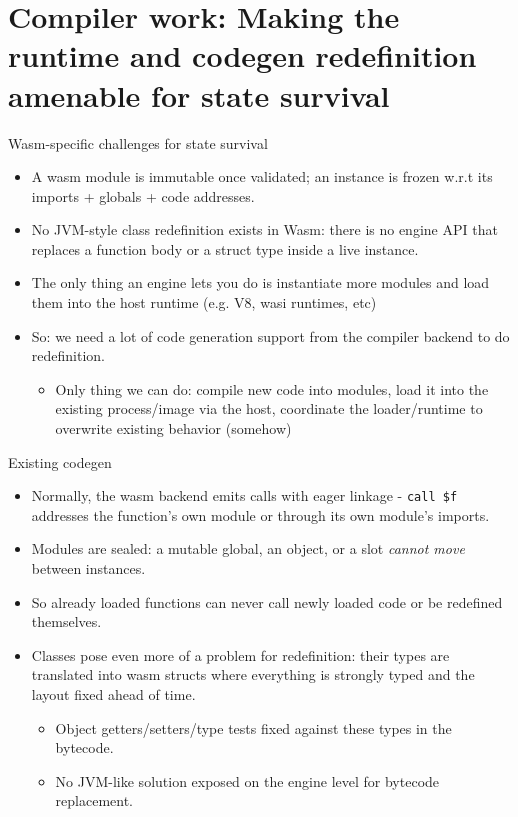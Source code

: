 \documentclass[10pt,presentation]{beamer}
\begin{document}
\section*{Compiler work: Making the runtime and codegen redefinition amenable for state survival}
\label{sec:org647bbfc}

\begin{frame}[label={sec:orgbf0cb6b}]{Wasm-specific challenges for state survival}
\begin{itemize}
\item A wasm module is immutable once validated; an instance is frozen
w.r.t its imports + globals + code addresses.
\item No JVM-style class redefinition exists in Wasm: there is no engine
API that replaces a function body or a struct type inside a live
instance.
\item The \alert{only} thing an engine lets you do is instantiate \alert{more} modules
and load them into the host runtime (e.g. V8, wasi runtimes, etc)
\item So: we need a lot of code generation support from the compiler
backend to do redefinition.
\begin{itemize}
\item Only thing we can do: compile new code into modules, load it into
the existing process/image via the host, coordinate the
loader/runtime to overwrite existing behavior (somehow)
\end{itemize}
\end{itemize}
\end{frame}
\begin{frame}[label={sec:orgbed6dab},fragile]{Existing codegen}
 \begin{itemize}
\item Normally, the wasm backend emits calls with eager linkage - \texttt{call
  \$f} addresses the function's own module or through its own module's
imports.
\item Modules are sealed: a mutable global, an object, or a slot \emph{cannot
move} between instances.
\item So already loaded functions can never call newly loaded code or be
redefined themselves.
\item Classes pose even more of a problem for redefinition: their types
are translated into wasm structs where everything is strongly typed
and the layout fixed ahead of time.
\begin{itemize}
\item Object getters/setters/type tests fixed against these types in the
bytecode.
\item No JVM-like solution exposed on the engine level for bytecode
replacement.
\end{itemize}
\end{itemize}
\end{frame}
\end{document}
